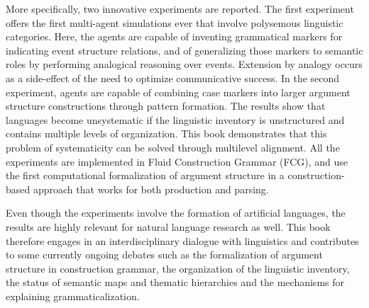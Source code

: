More specifically, two innovative experiments are reported. The first experiment offers the first multi-agent simulations ever that involve polysemous linguistic categories. Here, the agents are capable of inventing grammatical markers for indicating event structure relations, and of generalizing those markers to semantic roles by performing analogical reasoning over events. Extension by analogy occurs as a side-effect of the need to optimize communicative success. In the second experiment, agents are capable of combining case markers into larger argument structure constructions through pattern formation. The results show that languages become unsystematic if the linguistic inventory is unstructured and contains multiple levels of organization. This book demonstrates that this problem of systematicity can be solved through multilevel alignment. All the experiments are implemented in Fluid Construction Grammar (FCG), and use the first computational formalization of argument structure in a construction-based approach that works for both production and parsing.

Even though the experiments involve the formation of artificial languages, the results are highly relevant for natural language research as well. This book therefore engages in an interdisciplinary dialogue with linguistics and contributes to some currently ongoing debates such as the formalization of argument structure in construction grammar, the organization of the linguistic inventory, the status of semantic maps and thematic hierarchies and the mechanisms for explaining grammaticalization.

